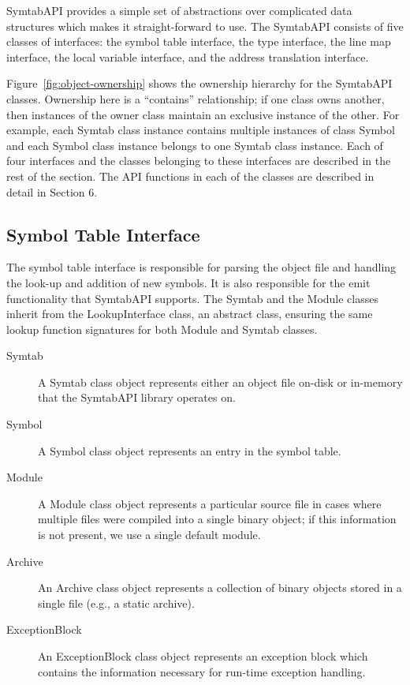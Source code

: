 SymtabAPI provides a simple set of abstractions over complicated data structures
which makes it straight-forward to use. The SymtabAPI consists of five classes of
interfaces: the symbol table interface, the type interface, the line map
interface, the local variable interface, and the address translation interface. 

Figure~\ref{fig:object-ownership} shows the ownership hierarchy for the
SymtabAPI classes. Ownership here is a ``contains'' relationship; if one
class owns another, then instances of the owner class maintain an exclusive
instance of the other. For example, each Symtab class instance contains multiple
instances of class Symbol and each Symbol class instance belongs to one Symtab
class instance. Each of four interfaces and the classes belonging to these
interfaces are described in the rest of the section. The API functions in each
of the classes are described in detail in Section 6.

\subsection{Symbol Table Interface}

The symbol table interface is responsible for parsing the object file and
handling the look-up and addition of new symbols. It is also responsible for the
emit functionality that SymtabAPI supports. The Symtab and the Module classes
inherit from the LookupInterface class, an abstract class, ensuring the same
lookup function signatures for both Module and Symtab classes. 

\begin{description}
\item[Symtab] A Symtab class object represents either an object file on-disk or in-memory that the SymtabAPI library operates on.
\item[Symbol] A Symbol class object represents an entry in the symbol table.
\item[Module] A Module class object represents a particular source file in cases where multiple files were compiled into a single binary object; if this information is not present, we use a single default module.
\item[Archive] An Archive class object represents a collection of binary objects stored in a single file (e.g., a static archive). 
\item[ExceptionBlock] An ExceptionBlock class object represents an exception block which contains the information necessary for run-time exception handling.
\end{description}

